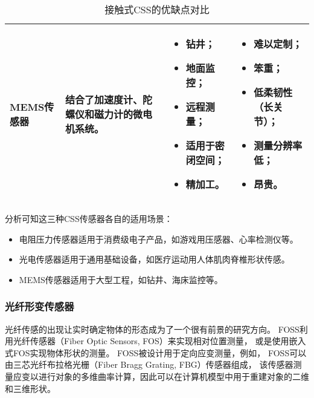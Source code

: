 \begin{table}[h]
\begin{center}
\begin{tabular}{p{}p{}p{}p{}}
\midrule

MEMS传感器 & 结合了加速度计、陀螺仪和磁力计的微电机系统。&
\begin{itemize}
\setlength{\topsep}{0pt}
\setlength{\itemsep}{0pt}
\setlength{\parsep}{0pt}
\setlength{\parskip}{0pt}
    \item 钻井；
    \item 地面监控；
    \item 远程测量；
    \item 适用于密闭空间；
    \item 精加工。
\end{itemize}
& 
\begin{itemize}
\setlength{\itemsep}{0pt}
\setlength{\parsep}{0pt}
\setlength{\parskip}{0pt}
    \item 难以定制；
    \item 笨重；
    \item 低柔韧性（长关节）；
    \item 测量分辨率低；
    \item 昂贵。
\end{itemize} \\
\bottomrule
\end{tabular}
\end{center}
\caption{接触式CSS的优缺点对比\cite{recent-dev-in-foss}}
\label{table:css}
\end{table}

分析可知这三种CSS传感器各自的适用场景：

\begin{itemize}
\setlength{\topsep}{0pt}
\setlength{\itemsep}{0pt}
\setlength{\parsep}{0pt}
\setlength{\parskip}{0pt}
    \item 电阻压力传感器适用于消费级电子产品，如游戏用压感器、心率检测仪等。
    \item 光电传感器适用于通用基础设备，如医疗运动用人体肌肉脊椎形状传感。
    \item MEMS传感器适用于大型工程，如钻井、海床监控等。
\end{itemize}

\subsubsection{光纤形变传感器}

光纤传感的出现让实时确定物体的形态成为了一个很有前景的研究方向。
FOSS利用光纤传感器（Fiber Optic Sensors, FOS）来实现相对位置测量，
或是使用嵌入式FOS实现物体形状的测量。
FOSS被设计用于定向应变测量，例如，
FOSS可以由三芯光纤布拉格光栅（Fiber Bragg Grating, FBG）传感器组成，
该传感器测量应变以进行对象的多维曲率计算，因此可以在计算机模型中用于重建对象的二维和三维形状。

